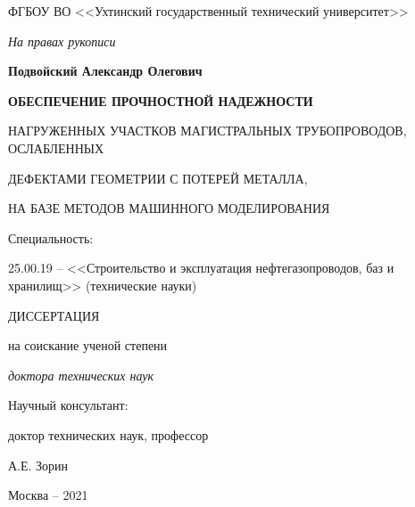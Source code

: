 \thispagestyle{empty}%
	\begin{center}
		ФГБОУ ВО <<Ухтинский государственный технический университет>>
	\end{center}
	\vspace{\baselineskip}\vspace{-5mm}

	\begin{flushright}
		\itshape
		На правах рукописи
	\end{flushright}
	\vspace{\baselineskip}\vspace{-3mm}
	
	\begin{center}
		\textbf{Подвойский Александр Олегович}
	\end{center}
	\vspace{5mm}
	
	\begin{center}
		\bfseries
			ОБЕСПЕЧЕНИЕ ПРОЧНОСТНОЙ НАДЕЖНОСТИ
			
			НАГРУЖЕННЫХ УЧАСТКОВ МАГИСТРАЛЬНЫХ ТРУБОПРОВОДОВ, ОСЛАБЛЕННЫХ
			
			ДЕФЕКТАМИ ГЕОМЕТРИИ С ПОТЕРЕЙ МЕТАЛЛА,
			
			НА БАЗЕ МЕТОДОВ МАШИННОГО МОДЕЛИРОВАНИЯ
	\end{center}
	\vspace{\baselineskip}\vspace{-9mm}
	
	\begin{center}
		Специальность:
		
		25.00.19 -- <<Строительство и эксплуатация нефтегазопроводов, баз и хранилищ>> (технические науки)
	\end{center}
	\vspace{\baselineskip}\vspace{-8mm}

	\begin{center}
		ДИССЕРТАЦИЯ
		
		на соискание ученой степени
		
		\emph{доктора технических наук}
	\end{center}
	\vspace{\baselineskip}\vspace{5mm}

	\begin{flushright}
		Научный консультант:
		
		доктор технических наук, профессор
		
		А.Е. Зорин
	\end{flushright}

	\vfill
	\begin{center}
		Москва -- 2021
	\end{center}
\newpage
